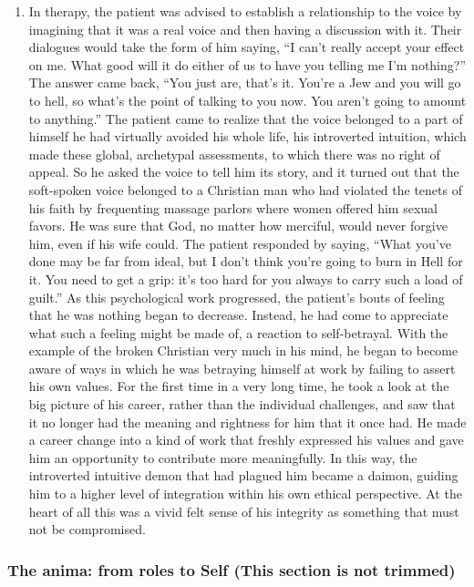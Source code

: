 \begin{enumerate}
\item {} In therapy, the
patient was advised to establish a relationship to the voice by imagining that
it was a real voice and then having a discussion with it. Their dialogues would
take the form of him saying, ``I can't really accept your effect on me. What
good will it do either of us to have you telling me I'm nothing?'' The answer
came back, ``You just are, that's it. You're a Jew and you will go to hell, so
what's the point of talking to you now. You aren't going to amount to
anything.'' The patient came to realize that the voice belonged to a part of
himself he had virtually avoided his whole life, his introverted intuition,
which made these global, archetypal assessments, to which there was no right of
appeal. So he asked the voice to tell him its story, and it turned out that the
soft-spoken voice belonged to a Christian man who had violated the tenets of
his faith by frequenting massage parlors where women offered him sexual favors.
He was sure that God, no matter how merciful, would never forgive him, even if
his wife could. The patient responded by saying, ``What you've done may be far
from ideal, but I don't think you're going to burn in Hell for it. You need to
get a grip: it's too hard for you always to carry such a load of guilt.'' As
this psychological work progressed, the patient's bouts of feeling that he was
nothing began to decrease. Instead, he had come to appreciate what such a
feeling might be made of, a reaction to self-betrayal. With the example of the
broken Christian very much in his mind, he began to become aware of ways in
which he was betraying himself at work by failing to assert his own values. For
the first time in a very long time, he took a look at the big picture of his
career, rather than the individual challenges, and saw that it no longer had
the meaning and rightness for him that it once had. He made a career change
into a kind of work that freshly expressed his values and gave him an
opportunity to contribute more meaningfully. In this way, the introverted
intuitive demon that had plagued him became a daimon, guiding him to a higher
level of integration within his own ethical perspective. At the heart of all
this was a vivid felt sense of his integrity as something that must not be
compromised.

\end{enumerate}

\subsubsection{The anima: from roles to Self {\footnotesize (This section is not trimmed)}}


